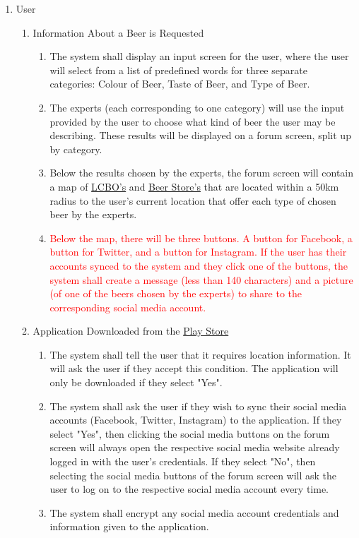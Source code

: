 \documentclass[]{article}
\begin{document}
\begin{enumerate}[{VP}1.]
	\item User
	
	\begin{enumerate}[{BE1}.1]
		\item Information About a Beer is Requested
		\begin{enumerate}
			\item The system shall display an input screen for the user, where the user will select from a list of predefined words for three separate categories: Colour of Beer, Taste of Beer, and Type of Beer.
			\item The experts (each corresponding to one category) will use the input provided by the user to choose what kind of beer the user may be describing. These results will be displayed on a forum screen, split up by category.
			\item Below the results chosen by the experts, the forum screen will contain a map of \underline{LCBO's} and \underline{Beer Store's} that are located within a 50km radius to the user's current location that offer each type of chosen beer by the experts.
			\item \textcolor{red}{Below the map, there will be three buttons. A button for Facebook, a button for Twitter, and a button for Instagram. If the user has their accounts synced to the system and they click one of the buttons, the system shall create a message (less than 140 characters) and a picture (of one of the beers chosen by the experts) to share to the corresponding social media account.}
		\end{enumerate}
		
		\item Application Downloaded from the \underline{Play Store}
		\begin{enumerate}
			\item The system shall tell the user that it requires location information. It will ask the user if they accept this condition. The application will only be downloaded if they select "Yes".
			\item The system shall ask the user if they wish to sync their social media accounts (Facebook, Twitter, Instagram) to the application. If they select "Yes", then clicking the social media buttons on the forum screen will always open the respective social media website already logged in with the user's credentials. If they select "No", then selecting the social media buttons of the forum screen will ask the user to log on to the respective social media account every time.
			\item The system shall encrypt any social media account credentials and information given to the application. 
		\end{enumerate}
		

\end{enumerate}
\end{enumerate}
\end{document}
